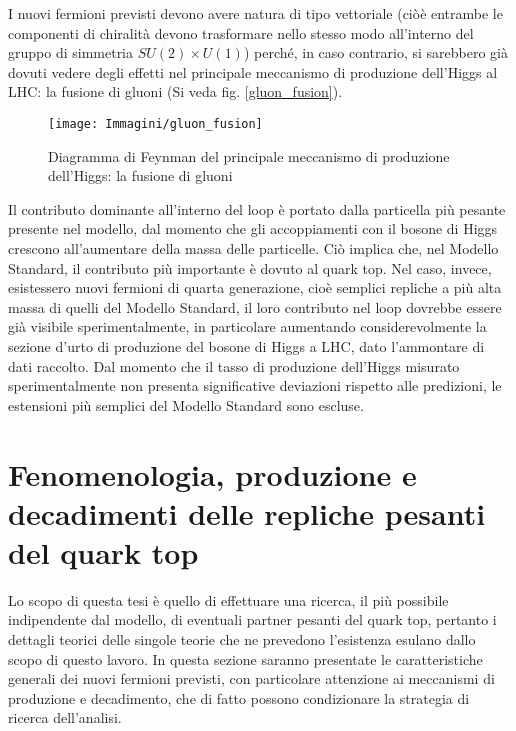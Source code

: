 \medskip
I nuovi fermioni previsti devono avere natura di tipo vettoriale (ciòè entrambe le componenti di chiralità devono trasformare nello stesso
modo all'interno del gruppo di simmetria $SU(2)\times U(1)$) perché, in caso contrario, si sarebbero già dovuti vedere degli effetti
nel principale meccanismo di produzione dell'Higgs al \ac{LHC}: la fusione di gluoni (Si veda fig. \ref{gluon_fusion}).

\begin{figure}[!htbp]
\begin{center}
\texttt{[image: Immagini/gluon\_fusion]}
\end{center}
\caption{Diagramma di Feynman del principale meccanismo di produzione dell'Higgs: la fusione di gluoni \label{gluon_fusion}}
\label{pair_T}
\end{figure}

Il contributo dominante all'interno del loop è portato dalla particella più pesante presente nel modello, dal momento che
gli accoppiamenti con il bosone di Higgs crescono all'aumentare della massa delle particelle.
\newline
Ciò implica che, nel Modello Standard, il contributo più importante è dovuto al quark top. Nel caso, invece, esistessero nuovi fermioni
di quarta generazione, cioè semplici repliche a più alta massa di quelli del Modello Standard, il loro contributo nel loop dovrebbe
essere già visibile sperimentalmente, in particolare aumentando considerevolmente la sezione d'urto di produzione del bosone di Higgs 
a LHC, dato l'ammontare di dati raccolto.
\newline
Dal momento che il tasso di produzione dell'Higgs misurato sperimentalmente non presenta significative deviazioni rispetto alle predizioni,
le estensioni più semplici del Modello Standard sono escluse.


\section{Fenomenologia, produzione e decadimenti delle repliche pesanti del quark top}
Lo scopo di questa tesi è quello di effettuare una ricerca, il più possibile indipendente dal modello, di eventuali partner pesanti del quark top,
pertanto i dettagli teorici delle singole teorie che ne prevedono l'esistenza esulano dallo scopo di questo lavoro.
\newline
In questa sezione saranno presentate le caratteristiche generali dei nuovi fermioni previsti, con particolare
attenzione ai meccanismi di produzione e decadimento, che di fatto possono condizionare la strategia di ricerca dell'analisi.

